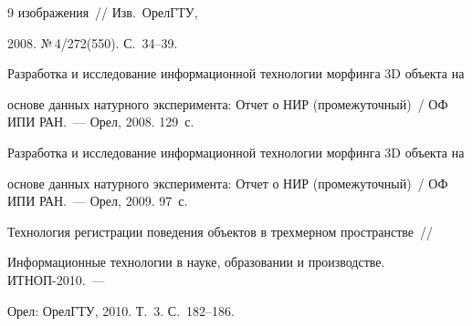 {\begin{thebibliography}{9}
изображения~// Изв.\ ОрелГТУ, %


2008.  №\,4/272(550). С.~34--39.









Разработка и исследование информационной технологии морфинга 3D объекта на 


основе данных натурного эксперимента: Отчет о НИР (промежуточный)~/ ОФ ИПИ РАН.~--- Орел, 2008. 129~с.









Разработка и исследование информационной технологии морфинга 3D объекта на 


основе данных натурного эксперимента: Отчет о НИР (промежуточный)~/ ОФ ИПИ РАН.~--- Орел, 2009.  97~с. 









Технология регистрации поведения объектов в трехмерном пространстве~// 


Информационные технологии в науке, образовании и производстве. ИТНОП-2010.~--- 


Орел: ОрелГТУ, 2010. Т.~3. С.~182--186.


\end{thebibliography}


}


